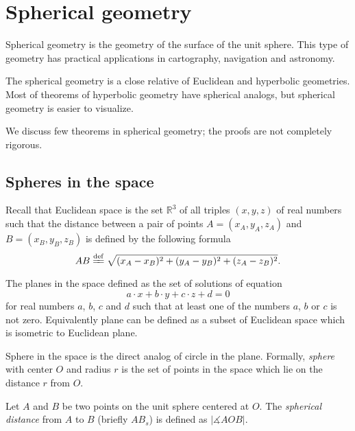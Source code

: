 
\chapter{Spherical geometry}
\label{chap:sphere}

Spherical geometry is the geometry 
of the surface of the unit sphere.
This type of geometry has practical  applications in cartography, navigation  and astronomy.

The spherical geometry is a close relative of Euclidean and hyperbolic geometries.
Most of theorems of hyperbolic geometry have spherical analogs,
but spherical geometry is easier to visualize. 

We discuss few theorems in spherical geometry;
the proofs are not completely rigorous.

\section*{Spheres in the space}

Recall that Euclidean space is the set $\mathbb{R}^3$ of all triples $(x,y,z)$ of real numbers
such that the distance between a pair of points
$A=(x_A,y_A,z_A)$ and $B=(x_B,y_B,z_B)$
is defined by the following formula
$$AB
\df
\sqrt{(x_A-x_B)^2+(y_A-y_B)^2+(z_A-z_B)^2}.$$

The planes in the space defined as the set of solutions of equation 
$$a\cdot x+b\cdot y+c\cdot z+d=0$$ 
for real numbers $a$, $b$, $c$ and $d$ such that at least one of the numbers $a$, $b$ or $c$ is not zero.
Equivalently plane can be defined as a subset of Euclidean space which is isometric to Euclidean plane.

Sphere in the space is the direct analog of circle in the plane.
Formally, \emph{sphere} with center $O$ and radius $r$ is the set of points in the space which lie on the distance $r$ from $O$.

Let $A$ and $B$ be two points on the unit sphere centered at $O$.
The \emph{spherical distance} from $A$ to $B$
(briefly $AB_s$)
 is defined as  $|\measuredangle AOB|$. 

